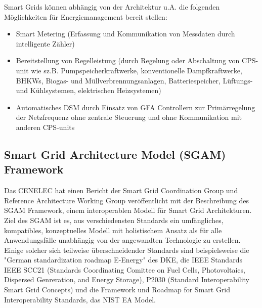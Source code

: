 			Smart Grids können abhängig von der Architektur u.A. die folgenden Möglichkeiten für Energiemanagement bereit stellen:
			\begin{itemize}
				\item Smart Metering (Erfassung und Kommunikation von Messdaten durch intelligente Zähler)
				\item Bereitstellung von Regelleistung (durch Regelung oder Abschaltung von CPS-unit wie sz.B. Pumpspeicherkraftwerke, konventionelle Dampfkraftwerke, BHKWs, Biogas- und Müllverbrennungsanlagen, Batteriespeicher, Lüftungs- und Kühlsystemen, elektrischen Heizsystemen)
				\item Automatisches \ac{DSM} durch Einsatz von \ac{GFA} Controllern zur Primärregelung der Netzfrequenz ohne zentrale Steuerung und ohne Kommunikation mit anderen CPS-units
			\end{itemize}




			
			\subsection{Smart Grid Architecture Model (SGAM) Framework}
				Das \ac{CENELEC} hat einen Bericht der Smart Grid Coordination Group und Reference Architecture
				Working Group veröffentlicht mit der Beschreibung des \ac{SGAM} Framework, einem interoperablen Modell für Smart Grid Architekturen. Ziel des SGAM ist es, aus verschiedensten Standards ein umfängliches, kompatibles, konzeptuelles Modell mit holistischem Ansatz als für alle Anwendungsfälle unabhängig von der angewandten Technologie zu erstellen. \cite{CENELEC_SmartGrid} \\
                
				Einige solcher sich teilweise überschneidender Standards sind beispielsweise die "German standardization roadmap E-Energy" des \ac{DKE}, die IEEE Standards IEEE SCC21 (Standards Coordinating Comittee on Fuel Cells, Photovoltaics, Dispersed Genreration, and Energy Storage), P2030 (Standard Interoperability Smart Grid Concepts) und die Framework und Roadmap for Smart Grid Interoperability Standards, das \ac{NIST EA Model}. \cite{DKE_SmartHome} \\ %
				
